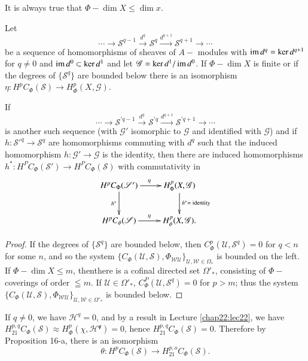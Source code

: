 \begin{remark*}%
It is always true that $\Phi - \dim X \leq \dim x$. 
\end{remark*}

\begin{proposition}\label{chap23:prop17}%
Let 
$$
\cdots \to \mathscr{S}^{q-1 } \xrightarrow{d^q} \mathscr{S}^{q}
\xrightarrow{d^{q+1}} \mathscr{S}^{q+1 } \to \cdots  
$$
be a sequence of homomorphisms of sheaves of $A-$ modules
  with $\operatorname{im} d^q = \ker d^{q + 1}$ for $q \neq 0 $  and $\operatorname{im} d^0
\subset \ker d^1 $ and let $\mathscr{G}=  \ker d^1 / \operatorname{im}
d^0$. If $\Phi - \dim X$ is finite or if the degrees of 
$\{\mathscr{S}^q\}$ are bounded below there is an isomorphism 
$\eta : H^p C_{\Phi } (\mathscr{S}) \to H^p_\Phi (X, \mathscr{G})$.  

If 
$$
\cdots \to \mathscr{S}^{'q-1 } \xrightarrow{d^q} \mathscr{S}^{'q}
\xrightarrow{d^{q+1}} \mathscr{S}^{'q+1 } \to \cdots  
$$
is another such sequence (with $\mathscr{G}'$
isomorphic to $\mathscr{G}$ and identified with 
$\mathscr{G}$) and if $h : \mathscr{S}'^{q} \to
\mathscr{S}^q$ are homomorphisms commuting with $d^q$
such that the induced homomorphism $h : \mathscr{G}' \to
\mathscr{G}$ is the identity, then there are induced
  homomorphisms $h^* : H^P C _{\Phi } (\mathscr{S}') \to H^P C_{\Phi}
(\mathscr{S})$ with commutativity in  
\[
\xymatrix{
H^p C_{\Phi} (\mathscr{S}')\ar[r]^{\eta}\ar[d]_{h^{\ast}} &
H^p_{\Phi} (X, \mathscr{G}) \ar[d]^{h^{\ast} = \text{ identity}}\\
H^p C_{\phi} (\mathscr{S}) \ar[r]^{\eta} & H^p_{\phi} (X,\mathscr{G}).
}
\]
\end{proposition}


\begin{proof}
If the degrees of $\{ \mathscr{S}^q\}$ are bounded below, then
$C^p_{\Phi } (\mathscr{U}, \mathscr{S}^q) = 0 $ for $q < n $ for some
$n$, and so the system $\bigg\{C_\Phi (\mathscr{U}, \mathscr{S}),
\Phi_{\mathscr{W} \mathscr{U}}\bigg\}_{ \mathscr{U}, \mathscr{W} \in
  \Omega_*}$ is bounded on the left. If $\Phi - \dim X \leq m$,
then\pageoriginale there is a cofinal directed set $\Omega'_*$,
consisting of $\Phi-$coverings of order $\leqq m$. If $\mathscr{U}
\in \Omega'_*$, 
$C^P_{\Phi } (\mathscr{U}, \mathscr{S}^q) = 0 $ for $p > m$; thus the
system $\bigg\{C_\Phi (\mathscr{U}, \mathscr{S}), \Phi_{\mathscr{W}
  \mathscr{U}}\bigg\}_{ \mathscr{U}, \mathscr{W} \in \Omega'_*}$ is
bounded below.  
\end{proof}

If $q \neq 0$, we have $\mathscr{H}^q = 0 $, and by a result in
Lecture \ref{chap22:lec22}, we have $H^{p,q}_{21} C_\Phi (\mathscr{S})
\approx H^p_\Phi 
(\chi, \mathscr{H^q}) = 0$, hence $H^{p,q}_{21} C_\Phi (\mathscr{S}) =
0$. Therefore by Proposition 16-a, there is an isomorphism  
$$
\theta : H^p C_\Phi (\mathscr{S}) \to H^{p,o}_{21} C_\Phi
(\mathscr{S}). 
$$

